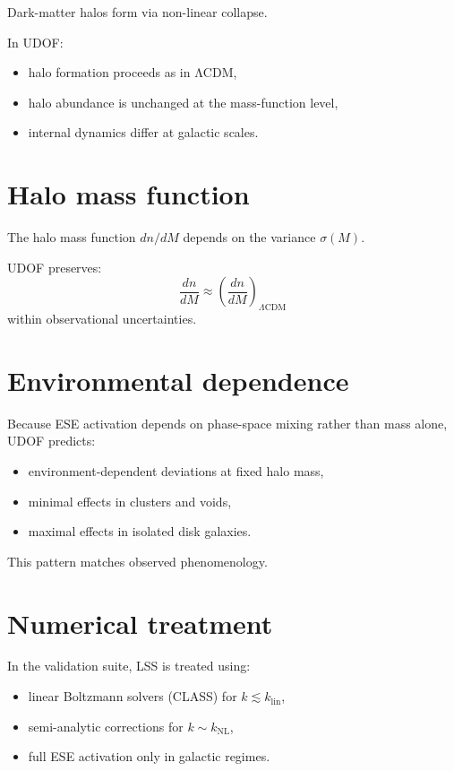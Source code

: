 \documentclass[11pt]{book}
\begin{document}
Dark-matter halos form via non-linear collapse.

In UDOF:
\begin{itemize}
\item halo formation proceeds as in ΛCDM,
\item halo abundance is unchanged at the mass-function level,
\item internal dynamics differ at galactic scales.
\end{itemize}

\section{Halo mass function}

The halo mass function $dn/dM$ depends on the variance $\sigma(M)$.

UDOF preserves:
\begin{equation}
\frac{dn}{dM} \approx \left(\frac{dn}{dM}\right)_{\Lambda\mathrm{CDM}}
\end{equation}
within observational uncertainties.

\section{Environmental dependence}

Because ESE activation depends on phase-space mixing rather than mass
alone, UDOF predicts:
\begin{itemize}
\item environment-dependent deviations at fixed halo mass,
\item minimal effects in clusters and voids,
\item maximal effects in isolated disk galaxies.
\end{itemize}

This pattern matches observed phenomenology.

\section{Numerical treatment}

In the validation suite, LSS is treated using:
\begin{itemize}
\item linear Boltzmann solvers (CLASS) for $k \lesssim k_{\mathrm{lin}}$,
\item semi-analytic corrections for $k \sim k_{\mathrm{NL}}$,
\item full ESE activation only in galactic regimes.
\end{itemize}
\end{document}
